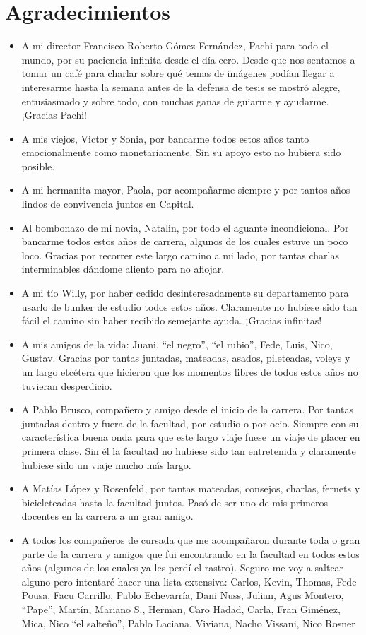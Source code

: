 \chapter*{Agradecimientos}
\begin{itemize}
    \item A mi director Francisco Roberto Gómez Fernández, Pachi para todo el mundo, por su paciencia infinita desde el día cero. Desde que nos sentamos a tomar un café para charlar sobre qué temas de imágenes podían llegar a interesarme hasta la semana antes de la defensa de tesis se mostró alegre, entusiasmado y sobre todo, con muchas ganas de guiarme y ayudarme. ¡Gracias Pachi!
    \item A mis viejos, Victor y Sonia, por bancarme todos estos años tanto emocionalmente como monetariamente. Sin su apoyo esto no hubiera sido posible.
    \item A mi hermanita mayor, Paola, por acompañarme siempre y por tantos años lindos de convivencia juntos en Capital.
    \item Al bombonazo de mi novia, Natalin, por todo el aguante incondicional. Por bancarme todos estos años de carrera, algunos de los cuales estuve un poco loco. Gracias por recorrer este largo camino a mi lado, por tantas charlas interminables dándome aliento para no aflojar.
    \item A mi tío Willy, por haber cedido desinteresadamente su departamento para usarlo de bunker de estudio todos estos años. Claramente no hubiese sido tan fácil el camino sin haber recibido semejante ayuda. ¡Gracias infinitas!
    \item A mis amigos de la vida: Juani, ``el negro'', ``el rubio'', Fede, Luis, Nico, Gustav. Gracias por tantas juntadas, mateadas, asados, pileteadas, voleys y un largo etcétera que hicieron que los momentos libres de todos estos años no tuvieran desperdicio.
    \item A Pablo Brusco, compañero y amigo desde el inicio de la carrera. Por tantas juntadas dentro y fuera de la facultad, por estudio o por ocio. Siempre con su característica buena onda para que este largo viaje fuese un viaje de placer en primera clase. Sin él la facultad no hubiese sido tan entretenida y claramente hubiese sido un viaje mucho más largo.
    \item A Matías López y Rosenfeld, por tantas mateadas, consejos, charlas, fernets y bicicleteadas hasta la facultad juntos. Pasó de ser uno de mis primeros docentes en la carrera a un gran amigo.
    \item A todos los compañeros de cursada que me acompañaron durante toda o gran parte de la carrera y amigos que fui encontrando en la facultad en todos estos años (algunos de los cuales ya les perdí el rastro). Seguro me voy a saltear alguno pero intentaré hacer una lista extensiva: Carlos, Kevin, Thomas, Fede Pousa, Facu Carrillo, Pablo Echevarría, Dani Nuss, Julian, Agus Montero, ``Pape'', Martín, Mariano S., Herman, Caro Hadad, Carla, Fran Giménez, Mica, Nico ``el salteño'', Pablo Laciana, Viviana, Nacho Vissani, Nico Rosner

\end{itemize}
